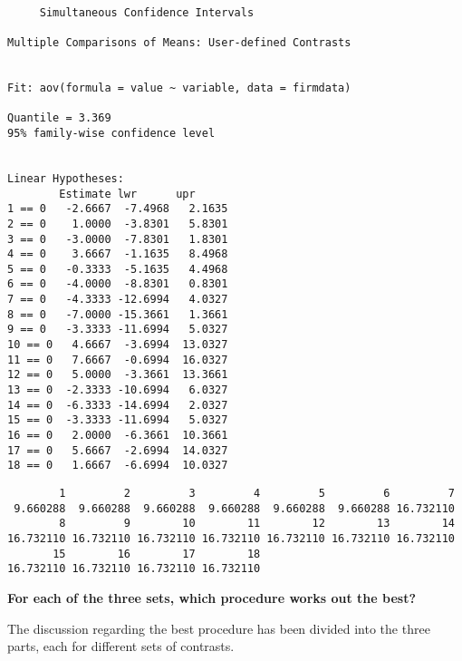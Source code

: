 \documentclass[]{article}
\newenvironment{Shaded}{\begin{snugshade}}{\end{snugshade}}
\newcommand{\StringTok}[1]{\textcolor[rgb]{0.31,0.60,0.02}{#1}}
\newcommand{\CommentTok}[1]{\textcolor[rgb]{0.56,0.35,0.01}{\textit{#1}}}
\newcommand{\OperatorTok}[1]{\textcolor[rgb]{0.81,0.36,0.00}{\textbf{#1}}}
\newcommand{\NormalTok}[1]{#1}
\begin{document}
\begin{verbatim}

     Simultaneous Confidence Intervals

Multiple Comparisons of Means: User-defined Contrasts


Fit: aov(formula = value ~ variable, data = firmdata)

Quantile = 3.369
95% family-wise confidence level
 

Linear Hypotheses:
        Estimate lwr      upr     
1 == 0   -2.6667  -7.4968   2.1635
2 == 0    1.0000  -3.8301   5.8301
3 == 0   -3.0000  -7.8301   1.8301
4 == 0    3.6667  -1.1635   8.4968
5 == 0   -0.3333  -5.1635   4.4968
6 == 0   -4.0000  -8.8301   0.8301
7 == 0   -4.3333 -12.6994   4.0327
8 == 0   -7.0000 -15.3661   1.3661
9 == 0   -3.3333 -11.6994   5.0327
10 == 0   4.6667  -3.6994  13.0327
11 == 0   7.6667  -0.6994  16.0327
12 == 0   5.0000  -3.3661  13.3661
13 == 0  -2.3333 -10.6994   6.0327
14 == 0  -6.3333 -14.6994   2.0327
15 == 0  -3.3333 -11.6994   5.0327
16 == 0   2.0000  -6.3661  10.3661
17 == 0   5.6667  -2.6994  14.0327
18 == 0   1.6667  -6.6994  10.0327
\end{verbatim}

\begin{Shaded}
\end{Shaded}

\begin{verbatim}
        1         2         3         4         5         6         7 
 9.660288  9.660288  9.660288  9.660288  9.660288  9.660288 16.732110 
        8         9        10        11        12        13        14 
16.732110 16.732110 16.732110 16.732110 16.732110 16.732110 16.732110 
       15        16        17        18 
16.732110 16.732110 16.732110 16.732110 
\end{verbatim}

\textbf{For each of the three sets, which procedure works out the best?}

The discussion regarding the best procedure has been divided into the
three parts, each for different sets of contrasts.
\end{document}
